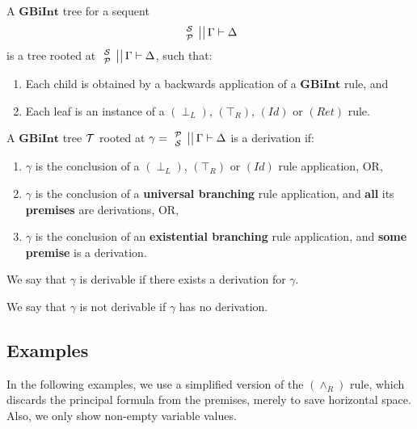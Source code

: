 \documentclass{llncs}
\numberwithin{equation}{section}
\newcommand{\Pred}{{\mathcal{P}}}
\newcommand{\Succ}{{\mathcal{S}}}
\newcommand{\ExAnd}{\wedge}
\newcommand{\sequent}{\vdash}
\newcommand{\Bottom}{\perp}
\newcommand{\Top}{\top}
\newcommand{\stacked}[2]{
\genfrac{}{}{0pt}{}{#1}{#2} 
 }
\newcommand{\mycal}[1]{
        {\cal{#1}}
}
\newcommand{\Sequent}[4]{
        \left. \left. \begin{array}{l} \hspace{-5pt} \stacked{#1}{#2}  \hspace{-5pt}\end{array} \ \right|\right| #3 \sequent #4
}
\newcommand{\SequentAny}{
        \Sequent{\Succ}{\Pred}{\Gamma}{\Delta}
}
\newcommand{\GBiInt}{\mathbf{GBiInt}}
\newcommand{\tree}[1]{
        {\mycal{#1}}
}
\newcommand{\IdRule}{(Id)}
\newcommand{\FalseLeftRule}{(\Bottom_L)}
\newcommand{\TrueRightRule}{(\Top_R)}
\newcommand{\AndRightRule}{(\ExAnd_R)}
\newcommand{\ReturnRule}{(Ret)}
\begin{document}
\begin{definition}[$\GBiInt$ tree]
A $\GBiInt$ tree for a sequent $$ \SequentAny $$ is a tree rooted at $\SequentAny$, such that:
\begin{enumerate}
	\item Each child is obtained by a backwards application of a $\GBiInt$ rule, and
	\item Each leaf is an instance of a $\FalseLeftRule$, $\TrueRightRule$, $\IdRule$ or $\ReturnRule$ rule.
\end{enumerate}
  
\end{definition}

\begin{definition}\label{derivation}
	A $\GBiInt$ tree $\tree{T}$ rooted at $ \gamma =  \Sequent{\Pred}{\Succ}{\Gamma}{\Delta} $ is a derivation if:
\begin{enumerate}
	\item $\gamma$ is the conclusion of a $\FalseLeftRule$, $\TrueRightRule$ or $\IdRule$ rule application, OR,
	\item $\gamma$ is the conclusion of a \textbf{universal branching} rule application, and \textbf{all} its \textbf{premises} are derivations, OR,
	\item $\gamma$ is the conclusion of an \textbf{existential branching} rule application, and \textbf{some} \textbf{premise} is a derivation.	
\end{enumerate}

\noindent We say that $\gamma$ is derivable if there exists a derivation for $\gamma$.

\noindent We say that $\gamma$ is not derivable if $\gamma$ has no derivation.

\end{definition}

\subsection{Examples}

In the following examples, we use a simplified version of the $\AndRightRule$ rule, which discards the principal formula from the premises, merely to save horizontal space. Also, we only show non-empty variable values.
\end{document}
